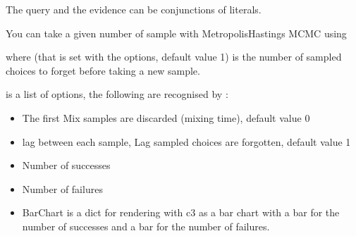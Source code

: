 \documentclass[letterpaper,10pt,english]{sphinxmanual}
\begin{document}
\sphinxAtStartPar
The query and the evidence can be conjunctions of literals.

\sphinxAtStartPar
You can take a given number of sample with Metropolis\sphinxhyphen{}Hastings MCMC using

\begin{sphinxVerbatim}[commandchars=\\\{\}]
  
\end{sphinxVerbatim}

\sphinxAtStartPar
where  (that is set with the options, default value 1) is the number of sampled choices to forget before taking a new sample.

\sphinxAtStartPar
{} is a list of options, the following are recognised by :
\begin{itemize}
\item {} 
\sphinxAtStartPar
{} The first Mix samples are discarded (mixing time), default value 0

\item {} 
\sphinxAtStartPar
{} lag between each sample, Lag sampled choices are forgotten, default value 1

\item {} 
\sphinxAtStartPar
{} Number of successes

\item {} 
\sphinxAtStartPar
{} Number of failures

\item {} 
\sphinxAtStartPar
{} BarChart is a dict for rendering with c3 as a bar chart with a bar for the number of successes and a bar for the number of failures.

\end{itemize}
\end{document}
